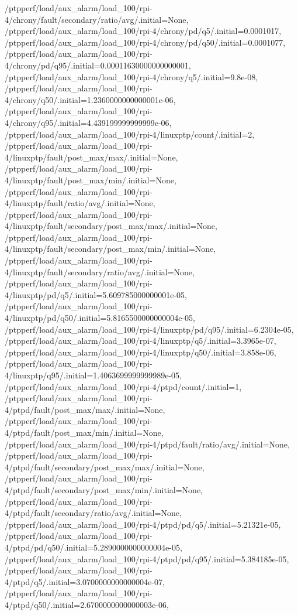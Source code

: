 {    /ptpperf/load/aux_alarm/load_100/rpi-4/chrony/fault/secondary/ratio/avg/.initial=None,
    /ptpperf/load/aux_alarm/load_100/rpi-4/chrony/pd/q5/.initial=0.0001017,
    /ptpperf/load/aux_alarm/load_100/rpi-4/chrony/pd/q50/.initial=0.0001077,
    /ptpperf/load/aux_alarm/load_100/rpi-4/chrony/pd/q95/.initial=0.00011630000000000001,
    /ptpperf/load/aux_alarm/load_100/rpi-4/chrony/q5/.initial=9.8e-08,
    /ptpperf/load/aux_alarm/load_100/rpi-4/chrony/q50/.initial=1.2360000000000001e-06,
    /ptpperf/load/aux_alarm/load_100/rpi-4/chrony/q95/.initial=4.439199999999999e-06,
    /ptpperf/load/aux_alarm/load_100/rpi-4/linuxptp/count/.initial=2,
    /ptpperf/load/aux_alarm/load_100/rpi-4/linuxptp/fault/post_max/max/.initial=None,
    /ptpperf/load/aux_alarm/load_100/rpi-4/linuxptp/fault/post_max/min/.initial=None,
    /ptpperf/load/aux_alarm/load_100/rpi-4/linuxptp/fault/ratio/avg/.initial=None,
    /ptpperf/load/aux_alarm/load_100/rpi-4/linuxptp/fault/secondary/post_max/max/.initial=None,
    /ptpperf/load/aux_alarm/load_100/rpi-4/linuxptp/fault/secondary/post_max/min/.initial=None,
    /ptpperf/load/aux_alarm/load_100/rpi-4/linuxptp/fault/secondary/ratio/avg/.initial=None,
    /ptpperf/load/aux_alarm/load_100/rpi-4/linuxptp/pd/q5/.initial=5.609785000000001e-05,
    /ptpperf/load/aux_alarm/load_100/rpi-4/linuxptp/pd/q50/.initial=5.8165500000000004e-05,
    /ptpperf/load/aux_alarm/load_100/rpi-4/linuxptp/pd/q95/.initial=6.2304e-05,
    /ptpperf/load/aux_alarm/load_100/rpi-4/linuxptp/q5/.initial=3.3965e-07,
    /ptpperf/load/aux_alarm/load_100/rpi-4/linuxptp/q50/.initial=3.858e-06,
    /ptpperf/load/aux_alarm/load_100/rpi-4/linuxptp/q95/.initial=1.4063699999999989e-05,
    /ptpperf/load/aux_alarm/load_100/rpi-4/ptpd/count/.initial=1,
    /ptpperf/load/aux_alarm/load_100/rpi-4/ptpd/fault/post_max/max/.initial=None,
    /ptpperf/load/aux_alarm/load_100/rpi-4/ptpd/fault/post_max/min/.initial=None,
    /ptpperf/load/aux_alarm/load_100/rpi-4/ptpd/fault/ratio/avg/.initial=None,
    /ptpperf/load/aux_alarm/load_100/rpi-4/ptpd/fault/secondary/post_max/max/.initial=None,
    /ptpperf/load/aux_alarm/load_100/rpi-4/ptpd/fault/secondary/post_max/min/.initial=None,
    /ptpperf/load/aux_alarm/load_100/rpi-4/ptpd/fault/secondary/ratio/avg/.initial=None,
    /ptpperf/load/aux_alarm/load_100/rpi-4/ptpd/pd/q5/.initial=5.21321e-05,
    /ptpperf/load/aux_alarm/load_100/rpi-4/ptpd/pd/q50/.initial=5.2890000000000004e-05,
    /ptpperf/load/aux_alarm/load_100/rpi-4/ptpd/pd/q95/.initial=5.384185e-05,
    /ptpperf/load/aux_alarm/load_100/rpi-4/ptpd/q5/.initial=3.0700000000000004e-07,
    /ptpperf/load/aux_alarm/load_100/rpi-4/ptpd/q50/.initial=2.6700000000000003e-06,
}
